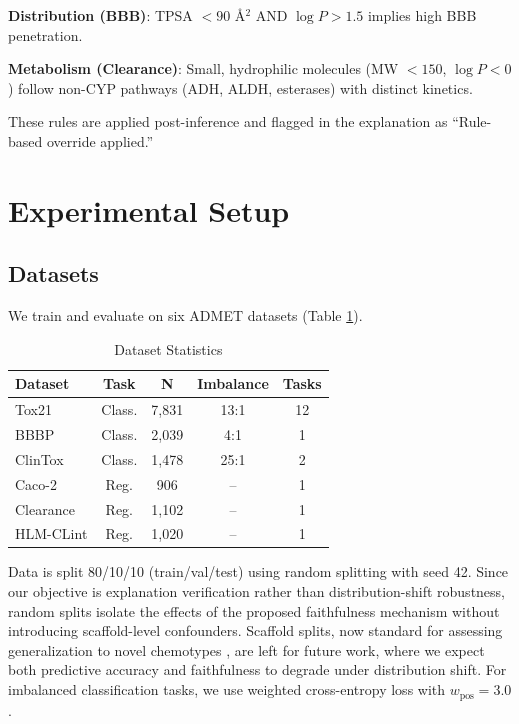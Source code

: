 \documentclass[conference]{IEEEtran}
\begin{document}
\textbf{Distribution (BBB)}: TPSA $< 90$ \AA$^2$ AND $\log P > 1.5$ implies high BBB penetration.

\textbf{Metabolism (Clearance)}: Small, hydrophilic molecules (MW $< 150$, $\log P < 0$) follow non-CYP pathways (ADH, ALDH, esterases) with distinct kinetics.

These rules are applied post-inference and flagged in the explanation as ``Rule-based override applied.''

\section{Experimental Setup}

\subsection{Datasets}

We train and evaluate on six ADMET datasets (Table \ref{tab:datasets}).

\begin{table}[h]
\centering
\caption{Dataset Statistics}
\label{tab:datasets}
\begin{tabular}{lcccc}
\toprule
\textbf{Dataset} & \textbf{Task} & \textbf{N} & \textbf{Imbalance} & \textbf{Tasks} \\
\midrule
Tox21 & Class. & 7,831 & 13:1 & 12 \\
BBBP & Class. & 2,039 & 4:1 & 1 \\
ClinTox & Class. & 1,478 & 25:1 & 2 \\
Caco-2 & Reg. & 906 & -- & 1 \\
Clearance & Reg. & 1,102 & -- & 1 \\
HLM-CLint & Reg. & 1,020 & -- & 1 \\
\bottomrule
\end{tabular}
\end{table}

Data is split 80/10/10 (train/val/test) using random splitting with seed 42. Since our objective is explanation verification rather than distribution-shift robustness, random splits isolate the effects of the proposed faithfulness mechanism without introducing scaffold-level confounders. Scaffold splits, now standard for assessing generalization to novel chemotypes \cite{hu2020strategies}, are left for future work, where we expect both predictive accuracy and faithfulness to degrade under distribution shift. For imbalanced classification tasks, we use weighted cross-entropy loss with $w_{\text{pos}} = 3.0$.
\end{document}
